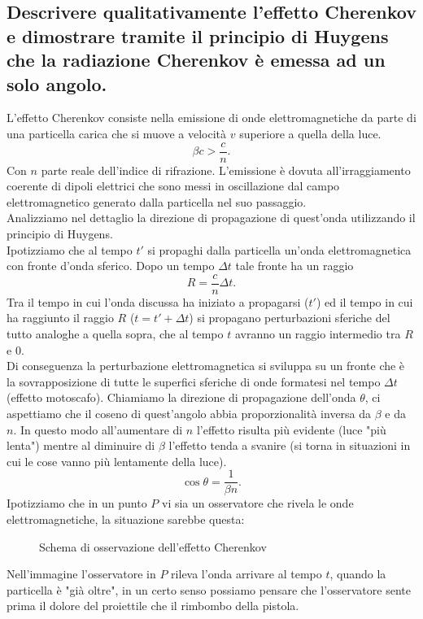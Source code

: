 \subsection[]{Descrivere qualitativamente l’effetto Cherenkov e dimostrare tramite il principio di Huygens che la radiazione Cherenkov è emessa ad un solo angolo.
}\label{sec:4.a.6}
L'effetto Cherenkov consiste nella emissione di onde elettromagnetiche da parte di una particella carica che si muove a velocità $v$ superiore a quella della luce.
\[
	\beta c> \frac{c}{n}
.\] 
Con $n$ parte reale dell'indice di rifrazione. L'emissione è dovuta all'irraggiamento coerente di dipoli elettrici che sono messi in oscillazione dal campo elettromagnetico generato dalla particella nel suo passaggio.\\
Analizziamo nel dettaglio la direzione di propagazione di quest'onda utilizzando il principio di Huygens.\\
Ipotizziamo che al tempo $t'$ si propaghi dalla particella un'onda elettromagnetica con fronte d'onda sferico. Dopo un tempo $\Delta t$ tale fronte ha un raggio 
\[
	R = \frac{c}{n} \Delta t
.\] 
Tra il tempo in cui l'onda discussa ha iniziato a propagarsi ($t'$) ed il tempo in cui ha raggiunto il raggio $R$ ($t = t'+ \Delta t$) si propagano perturbazioni sferiche del tutto analoghe a quella sopra, che al tempo $t$ avranno un raggio intermedio tra $R$ e $0$.\\
Di conseguenza la perturbazione elettromagnetica si sviluppa su un fronte che è la sovrapposizione di tutte le superfici sferiche di onde formatesi nel tempo $\Delta t$ (effetto motoscafo).
Chiamiamo la direzione di propagazione dell'onda $\theta$, ci aspettiamo che il coseno di quest'angolo abbia proporzionalità inversa da $\beta$ e da $n$. In questo modo all'aumentare di $n$ l'effetto risulta più evidente (luce "più lenta") mentre al diminuire di $\beta$ l'effetto tenda a svanire (si torna in situazioni in cui le cose vanno più lentamente della luce). 
 \[
	\cos\theta = \frac{1}{\beta n}
.\] 
Ipotizziamo che in un punto $P$ vi sia un osservatore che rivela le onde elettromagnetiche, la situazione sarebbe questa:
\begin{figure}[H]
    \centering
    \caption{Schema di osservazione dell'effetto Cherenkov}
    \label{fig:cherenkov-huygens}
\end{figure}
Nell'immagine l'osservatore in $P$ rileva l'onda arrivare al tempo $t$, quando la particella è "già oltre", in un certo senso possiamo pensare che l'osservatore sente prima il dolore del proiettile che il rimbombo della pistola.\\
